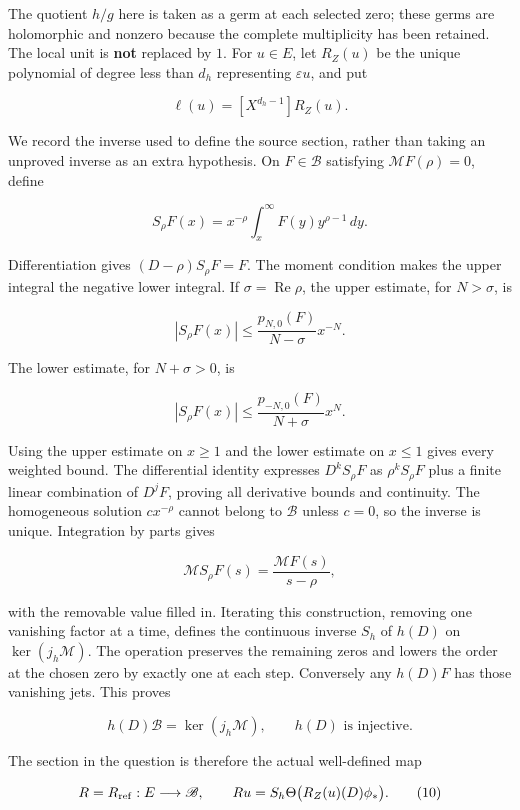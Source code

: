 \documentclass[
  11pt,
]{article}
\begin{document}
The quotient \(h/g\) here is taken as a germ at each selected zero;
these germs are holomorphic and nonzero because the complete
multiplicity has been retained. The local unit is \textbf{not} replaced
by \(1\). For \(u\in E\), let \(R_Z(u)\) be the unique polynomial of
degree less than \(d_h\) representing \(\varepsilon u\), and put

\[\ell(u)=[X^{d_h-1}]R_Z(u).\tag{8}\]

We record the inverse used to define the source section, rather than
taking an unproved inverse as an extra hypothesis. On \(F\in\mathscr B\)
satisfying \(\mathcal MF(\rho)=0\), define

\[S_\rho F(x)=x^{-\rho}\int_x^\infty F(y)y^{\rho-1}\,dy.\]

Differentiation gives \((D-\rho)S_\rho F=F\). The moment condition makes
the upper integral the negative lower integral. If
\(\sigma=\operatorname{Re}\rho\), the upper estimate, for \(N>\sigma\),
is

\[|S_\rho F(x)|\leq \frac{p_{N,0}(F)}{N-\sigma}x^{-N}.\]

The lower estimate, for \(N+\sigma>0\), is

\[|S_\rho F(x)|\leq \frac{p_{-N,0}(F)}{N+\sigma}x^{N}.\]

Using the upper estimate on \(x\geq1\) and the lower estimate on
\(x\leq1\) gives every weighted bound. The differential identity
expresses \(D^kS_\rho F\) as \(\rho^kS_\rho F\) plus a finite linear
combination of \(D^jF\), proving all derivative bounds and continuity.
The homogeneous solution \(cx^{-\rho}\) cannot belong to \(\mathscr B\)
unless \(c=0\), so the inverse is unique. Integration by parts gives

\[\mathcal MS_\rho F(s)=\frac{\mathcal MF(s)}{s-\rho},\]

with the removable value filled in. Iterating this construction,
removing one vanishing factor at a time, defines the continuous inverse
\(S_h\) of \(h(D)\) on \(\ker(j_h\mathcal M)\). The operation preserves
the remaining zeros and lowers the order at the chosen zero by exactly
one at each step. Conversely any \(h(D)F\) has those vanishing jets.
This proves

\[h(D)\mathscr B=\ker(j_h\mathcal M),\qquad h(D)\text{ is injective}.\tag{9}\]

The section in the question is therefore the actual well-defined map

\[R=R_{\rm ref}:E\longrightarrow\mathscr B,\qquad
Ru=S_h\Theta\bigl(R_Z(u)(D)\phi_*\bigr).\tag{10}\]
\end{document}
